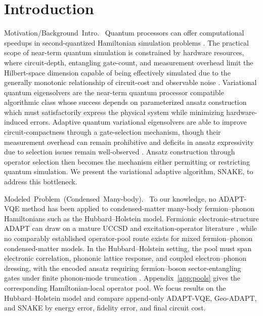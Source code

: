 \documentclass[
  reprint,
  amsmath,
  amssymb,
  aps,
  pra,
  nofootinbib,
  superscriptaddress,
  floatfix
]{revtex4-2}
\newcommand{\tentative}[1]{\textcolor{red!70!black}{#1}}
\newcommand{\structlabel}[1]{\noindent\mbox{\tentative{#1.}}~}
\begin{document}
\section{Introduction}

\structlabel{Motivation/Background Intro}
Quantum processors can offer computational speedups in second-quantized Hamiltonian simulation problems \cite{Lloyd1996,AspuruGuzik2005}. The practical scope of near-term quantum simulation is constrained by hardware resources, where circuit-depth, entangling gate-count, and measurement overhead limit the Hilbert-space dimension capable of being effectively simulated due to the generally monotonic relationship of circuit-cost and observable noise \cite{Preskill2018NISQ,Cerezo2021VQA,Huggins2021Measurements}. Variational quantum eigensolvers are the near-term quantum processor compatible algorithmic class whose success depends on parameterized ansatz construction which must satisfactorily express the physical system while minimizing hardware-induced errors.  Adaptive quantum variational eigensolvers are able to improve circuit-compactness through a gate-selection mechanism, though their measurement overhead can remain prohibitive and deficits in ansatz expressivity due to selection issues remain well-observed \cite{Grimsley2019,Tang2021,Yordanov2021,Feniou2023ADAPT,Ikhtiarudin2025ShotEfficient}.  Ansatz construction through operator selection then becomes the mechanism either permitting or restricting quantum simulation. We present the variational adaptive algorithm, SNAKE, to address this bottleneck.


\structlabel{Modeled Problem (Condensed Many-body)}
To our knowledge, no ADAPT-VQE method has been applied to condensed-matter many-body fermion--phonon Hamiltonians such as the Hubbard--Holstein model. Fermionic electronic-structure ADAPT can draw on a mature UCCSD and excitation-operator literature \cite{Romero2018UCC,Grimsley2019}, while no comparably established operator-pool route exists for mixed fermion--phonon condensed-matter models. In the Hubbard--Holstein setting, the pool must span electronic correlation, phononic lattice response, and coupled electron--phonon dressing, with the encoded ansatz requiring fermion--boson sector-entangling gates under finite phonon-mode truncation \cite{Hubbard1963,Holstein1959a,Holstein1959b}. Appendix~\ref{app:pools} gives the corresponding Hamiltonian-local operator pool. We focus results on the Hubbard--Holstein model and compare append-only ADAPT-VQE, Geo-ADAPT, and SNAKE by energy error, fidelity error, and final circuit cost.
\end{document}

